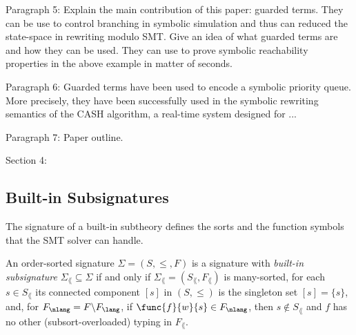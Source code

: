 Paragraph 5: Explain the main contribution of this paper: guarded
terms. They can be use to control branching in symbolic simulation and
thus can reduced the state-space in rewriting modulo SMT. Give an idea
of what guarded terms are and how they can be used. They can use to
prove symbolic reachability properties in the above example in matter
of seconds.

Paragraph 6: Guarded terms have been used to encode a symbolic
priority queue. More precisely, they have been successfully used in
the symbolic rewriting semantics of the CASH algorithm, a real-time
system designed for ...

Paragraph 7: Paper outline.


Section 4:


%




\subsection{Built-in Subsignatures}

The signature of a built-in subtheory defines the sorts and the
function symbols that the SMT solver can handle.

\begin{definition}\label{def.rewsmt.subsig}
  An order-sorted signature $\Sigma = (S,\leq,F)$ is a signature with
  {\em built-in subsignature} $\Sigma_\lang \subseteq \Sigma$ if and
  only if $\Sigma_\lang = (S_\lang,F_\lang)$ is many-sorted, for each
  $s \in S_\lang$ its connected component $[s]$ in $(S,\leq)$ is the
  singleton set $[s] = \{s\}$, and, for $F_\nlang = F{\setminus}
  F_\lang$, if $\func{f}{w}{s} \in F_\nlang$, then $s \notin S_\lang$
  and $f$ has no other (subsort-overloaded) typing in $F_\lang$.
\end{definition}

